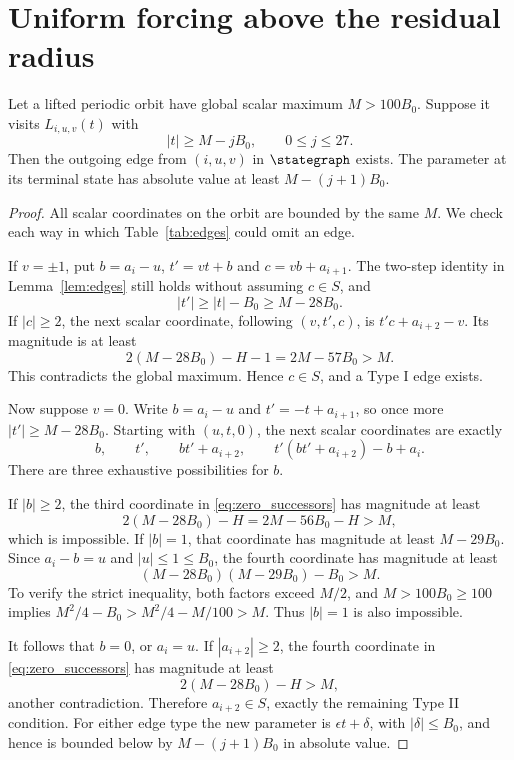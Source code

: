 \section{Uniform forcing above the residual radius}\label{sec:forcing}

\begin{lemma}\label{lem:forcing}
Let a lifted periodic orbit have global scalar maximum
\(M>100B_0\). Suppose it visits \(L_{i,u,v}(t)\) with
\begin{equation}\label{eq:parameter_lower}
 |t|\ge M-jB_0,\qquad 0\le j\le27.
\end{equation}
Then the outgoing edge from \((i,u,v)\) in \(\stategraph\) exists.
The parameter at its terminal state has absolute value at least
\(M-(j+1)B_0\).
\end{lemma}

\begin{proof}
All scalar coordinates on the orbit are bounded by the same \(M\).
We check each way in which Table~\ref{tab:edges} could omit an edge.

If \(v=\pm1\), put \(b=a_i-u\), \(t'=vt+b\) and
\(c=vb+a_{i+1}\). The two-step identity in Lemma~\ref{lem:edges}
still holds without assuming \(c\in S\), and
\[
 |t'|\ge |t|-B_0\ge M-28B_0.
\]
If \(|c|\ge2\), the next scalar coordinate, following
\((v,t',c)\), is \(t'c+a_{i+2}-v\). Its magnitude is at least
\begin{equation}\label{eq:typeI_bound}
 2(M-28B_0)-H-1=2M-57B_0>M.
\end{equation}
This contradicts the global maximum. Hence \(c\in S\), and a
Type I edge exists.

Now suppose \(v=0\). Write
\(b=a_i-u\) and \(t'=-t+a_{i+1}\), so once more
\(|t'|\ge M-28B_0\). Starting with \((u,t,0)\), the next scalar
coordinates are exactly
\begin{equation}\label{eq:zero_successors}
 b,\qquad t',\qquad bt'+a_{i+2},\qquad
 t'(bt'+a_{i+2})-b+a_i.
\end{equation}
There are three exhaustive possibilities for \(b\).

If \(|b|\ge2\), the third coordinate in
\eqref{eq:zero_successors} has magnitude at least
\[
 2(M-28B_0)-H=2M-56B_0-H>M,
\]
which is impossible. If \(|b|=1\), that coordinate has magnitude
at least \(M-29B_0\). Since \(a_i-b=u\) and \(|u|\le1\le B_0\),
the fourth coordinate has magnitude at least
\begin{equation}\label{eq:quadratic_bound}
 (M-28B_0)(M-29B_0)-B_0>M.
\end{equation}
To verify the strict inequality, both factors exceed \(M/2\), and
\(M>100B_0\ge100\) implies
\(M^2/4-B_0>M^2/4-M/100>M\).
Thus \(|b|=1\) is also impossible.

It follows that \(b=0\), or \(a_i=u\). If
\(|a_{i+2}|\ge2\), the fourth coordinate in
\eqref{eq:zero_successors} has magnitude at least
\[
 2(M-28B_0)-H>M,
\]
another contradiction. Therefore \(a_{i+2}\in S\), exactly the
remaining Type II condition. For either edge type the new parameter
is \(\epsilon t+\delta\), with \(|\delta|\le B_0\), and hence is
bounded below by \(M-(j+1)B_0\) in absolute value.
\end{proof}

